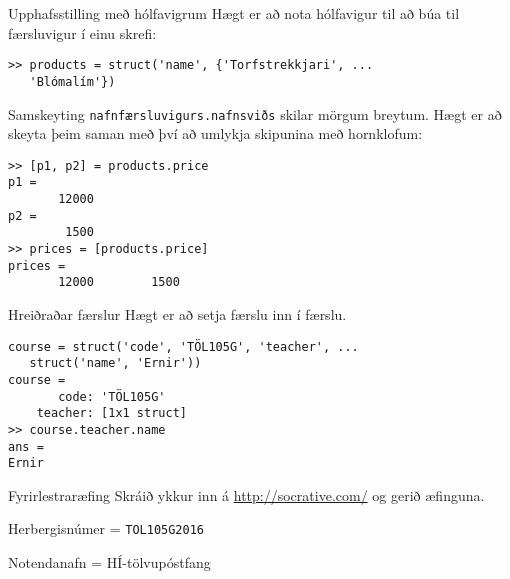\documentclass[handout]{beamer}
\begin{document}
\begin{frame}[fragile]{Upphafsstilling með hólfavigrum}
Hægt er að nota hólfavigur til að búa til færsluvigur í einu skrefi:

\begin{verbatim}
>> products = struct('name', {'Torfstrekkjari', ...
   'Blómalím'})
\end{verbatim}
\end{frame}

\begin{frame}[fragile]{Samskeyting}
\texttt{nafnfærsluvigurs.nafnsviðs} skilar mörgum breytum. Hægt er að skeyta þeim saman með því að umlykja skipunina með hornklofum:
\begin{verbatim}
>> [p1, p2] = products.price
p1 =
       12000
p2 =
        1500
>> prices = [products.price]
prices =
       12000        1500
\end{verbatim}
\end{frame}

\begin{frame}[fragile]{Hreiðraðar færslur}
Hægt er að setja færslu inn í færslu.

\begin{verbatim}
course = struct('code', 'TÖL105G', 'teacher', ...
   struct('name', 'Ernir'))
course = 
       code: 'TÖL105G'
    teacher: [1x1 struct]
>> course.teacher.name
ans =
Ernir
\end{verbatim}

\end{frame}


\begin{frame}{Fyrirlestraræfing}
Skráið ykkur inn á \url{http://socrative.com/} og gerið æfinguna.

Herbergisnúmer = \texttt{TOL105G2016}

Notendanafn = HÍ-tölvupóstfang
\end{frame}
\end{document}

